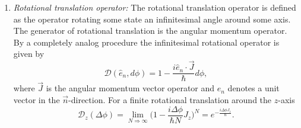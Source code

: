\begin{enumerate}
	\item \emph{Rotational translation operator:}\newline
	The rotational translation operator is defined as the operator rotating some state an infinitesimal angle around some axis. The generator of rotational translation is the angular momentum operator. By a completely analog procedure the infinitesimal rotational operator is given by
	\begin{equation}
		\mathcal{D}(\hat{e}_n,d\phi)=1-\frac{i\hat{e}_n\cdot\vec{J}}{\hbar}d\phi,
		\label{trans3}
	\end{equation} 
	where $\vec{J}$ is the angular momentum vector operator and $\hat{e}_n$ denotes a unit vector in the $\vec{n}$-direction. For a finite rotational translation around the $z$-axis
	\begin{equation}
		\mathcal{D}_z(\Delta\phi)=\lim\limits_{N\Rightarrow\infty}\bigg(1-\frac{i\Delta\phi}{\hbar N}J_z\bigg)^N=e^{-\frac{i\Delta \phi J_z}{\hbar}}.
		\label{trans finit3}
	\end{equation} 
	

\end{enumerate}

